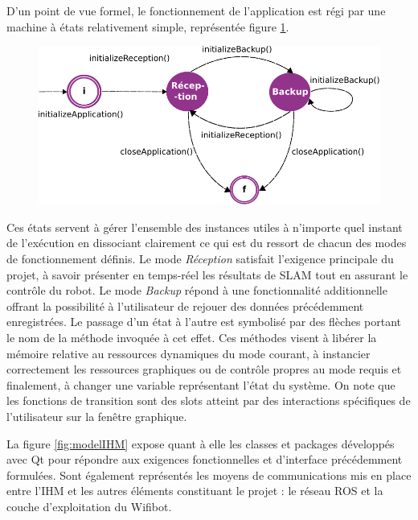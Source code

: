 D'un point de vue formel, le fonctionnement de l'application est régi par une machine à états relativement simple, représentée figure \ref{fig:stateMachine}.

\begin{figure}[h]
  \centering
    \includegraphics[width=.7\linewidth]{figures/state_machine}  
  \label{fig:stateMachine}
\end{figure}

Ces états servent à gérer l'ensemble des instances utiles à n'importe quel instant de l'exécution en dissociant clairement ce qui est du ressort de chacun des modes de fonctionnement définis. 
Le mode \emph{Réception} satisfait l'exigence principale du projet, à savoir présenter en temps-réel les résultats de \gls{SLAM} tout en assurant le contrôle du robot. 
Le mode \emph{Backup} répond à une fonctionnalité additionnelle offrant la possibilité à l'utilisateur de rejouer des données précédemment enregistrées. 
Le passage d'un état à l'autre est symbolisé par des flèches portant le nom de la méthode invoquée à cet effet.
Ces méthodes visent à libérer la mémoire relative au ressources dynamiques du mode courant, à instancier correctement les ressources graphiques ou de contrôle propres au mode requis et finalement, à changer une variable représentant 
l'état du système. 
On note que les fonctions de transition sont des slots atteint par des interactions spécifiques de l'utilisateur sur la fenêtre graphique. 

La figure \ref{fig:modelIHM} expose quant à elle les classes et packages développés avec Qt pour répondre aux exigences fonctionnelles et d'interface précédemment formulées.   
Sont également représentés les moyens de communications mis en place entre l'IHM et les autres éléments constituant le projet : le réseau \gls{ROS} et la couche d'exploitation du Wifibot. 

